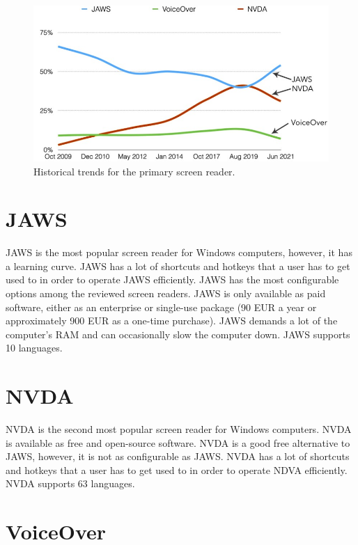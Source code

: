\begin{figure}[tp]
\centering
\includegraphics[keepaspectratio,width=\linewidth,height=\halfh]
{images/screen-readers-line.jpg}

\caption[Historical Trends for Primary Screen Reader]{
Historical trends for the primary screen reader.
}
\label{fig:screen-readers-line}
\end{figure}




\section{JAWS}
JAWS is the most popular screen reader for Windows computers, however, it has a learning curve. JAWS has a lot of shortcuts and hotkeys that a user has to get used to in order to operate JAWS efficiently. JAWS has the most configurable options among the reviewed screen readers. JAWS is only available as paid software, either as an enterprise or single-use package (90 EUR a year or approximately 900 EUR as a one-time purchase). JAWS demands a lot of the computer's RAM and can occasionally slow the computer down. JAWS supports 10 languages.

\section{NVDA}

NVDA is the second most popular screen reader for Windows computers. NVDA is available as free and open-source software. NVDA is a good free alternative to JAWS, however, it is not as configurable as JAWS. NVDA has a lot of shortcuts and hotkeys that a user has to get used to in order to operate NDVA efficiently. NVDA supports 63 languages.

\section{VoiceOver}

